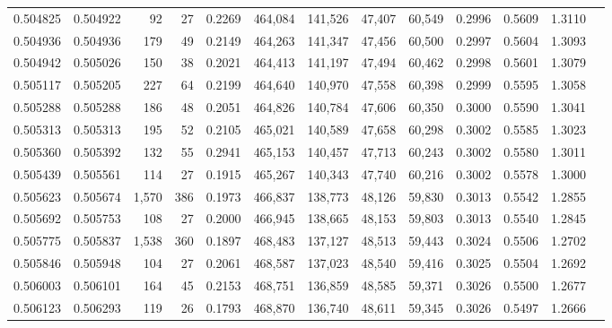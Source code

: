 \begin{tabular}{rrrrrrrrrrrrr}
0.504825 & 0.504922 &    92 &    27 &                                     0.2269 & 464,084 & 141,526 &  47,407 &  60,549 & 0.2996 & 0.5609 & 1.3110 \\
0.504936 & 0.504936 &   179 &    49 &                                     0.2149 & 464,263 & 141,347 &  47,456 &  60,500 & 0.2997 & 0.5604 & 1.3093 \\
0.504942 & 0.505026 &   150 &    38 &                                     0.2021 & 464,413 & 141,197 &  47,494 &  60,462 & 0.2998 & 0.5601 & 1.3079 \\
0.505117 & 0.505205 &   227 &    64 &                                     0.2199 & 464,640 & 140,970 &  47,558 &  60,398 & 0.2999 & 0.5595 & 1.3058 \\
0.505288 & 0.505288 &   186 &    48 &                                     0.2051 & 464,826 & 140,784 &  47,606 &  60,350 & 0.3000 & 0.5590 & 1.3041 \\
0.505313 & 0.505313 &   195 &    52 &                                     0.2105 & 465,021 & 140,589 &  47,658 &  60,298 & 0.3002 & 0.5585 & 1.3023 \\
0.505360 & 0.505392 &   132 &    55 &                                     0.2941 & 465,153 & 140,457 &  47,713 &  60,243 & 0.3002 & 0.5580 & 1.3011 \\
0.505439 & 0.505561 &   114 &    27 &                                     0.1915 & 465,267 & 140,343 &  47,740 &  60,216 & 0.3002 & 0.5578 & 1.3000 \\
0.505623 & 0.505674 & 1,570 &   386 &                                     0.1973 & 466,837 & 138,773 &  48,126 &  59,830 & 0.3013 & 0.5542 & 1.2855 \\
0.505692 & 0.505753 &   108 &    27 &                                     0.2000 & 466,945 & 138,665 &  48,153 &  59,803 & 0.3013 & 0.5540 & 1.2845 \\
0.505775 & 0.505837 & 1,538 &   360 &                                     0.1897 & 468,483 & 137,127 &  48,513 &  59,443 & 0.3024 & 0.5506 & 1.2702 \\
0.505846 & 0.505948 &   104 &    27 &                                     0.2061 & 468,587 & 137,023 &  48,540 &  59,416 & 0.3025 & 0.5504 & 1.2692 \\
0.506003 & 0.506101 &   164 &    45 &                                     0.2153 & 468,751 & 136,859 &  48,585 &  59,371 & 0.3026 & 0.5500 & 1.2677 \\
0.506123 & 0.506293 &   119 &    26 &                                     0.1793 & 468,870 & 136,740 &  48,611 &  59,345 & 0.3026 & 0.5497 & 1.2666 \\

\end{tabular}
